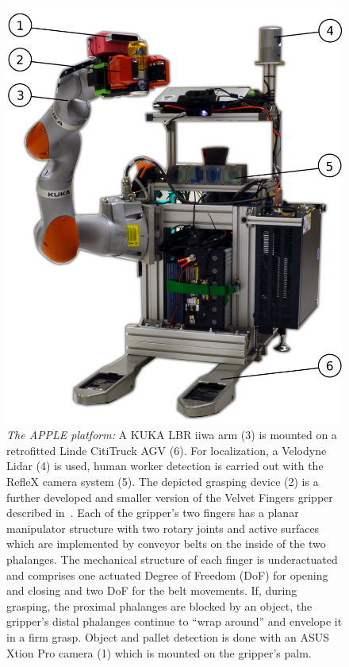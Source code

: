 \begin{figure}[t!]
\begin{center}
\includegraphics[width =0.85\linewidth]{figs/apple_demonstrator}
\caption{\textit{The APPLE platform:} A KUKA LBR iiwa arm (3) is mounted on a retrofitted Linde
  CitiTruck AGV (6). For localization, a Velodyne Lidar (4) is used, human worker detection is
  carried out with the RefleX camera system (5). The depicted grasping device (2) is a further
  developed and smaller version of the Velvet Fingers gripper described in~\cite{Tinc12}. Each of
  the gripper’s two fingers has a planar manipulator structure with two rotary joints and active
  surfaces which are implemented by conveyor belts on the inside of the two phalanges. The
  mechanical structure of each finger is underactuated and comprises one actuated Degree of Freedom
  (DoF) for opening and closing and two DoF for the belt movements. If, during grasping, the
  proximal phalanges are blocked by an object, the gripper’s distal phalanges continue to “wrap
  around” and envelope it in a firm grasp. Object and pallet detection is done with an ASUS Xtion
  Pro camera (1) which is mounted on the gripper's palm.}
\label{fig:robot}
\vspace{-0.65cm}
\end{center}
\end{figure}

